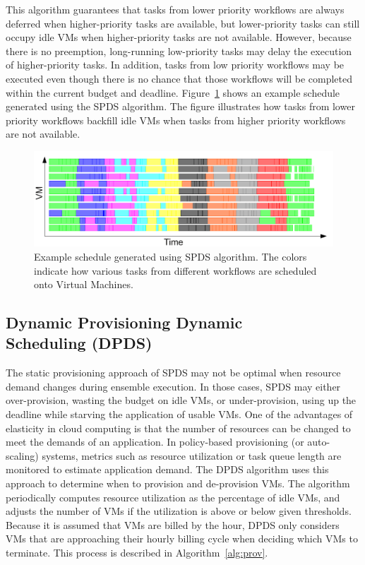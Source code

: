\documentclass{sig-alternate}
\begin{document}
This algorithm guarantees that tasks from lower priority workflows are
always deferred when higher-priority tasks are available, but lower-priority
tasks can still occupy idle VMs when higher-priority tasks are not available. 
However, because there is no preemption, long-running low-priority tasks may delay 
the execution of higher-priority tasks. In addition, tasks from low priority 
workflows may be executed even though there is no chance that those workflows 
will be completed within the current budget and deadline. Figure~\ref{fig:spds-example} 
shows an example schedule generated using the SPDS algorithm. The figure illustrates 
how tasks from lower priority workflows backfill idle VMs when tasks from higher 
priority workflows are not available.

\begin{figure}[htb] 
\centering
\includegraphics[width=1.0\columnwidth]{figures/spds-gantt}
 \caption{Example schedule generated using SPDS algorithm. The colors indicate how various tasks from different workflows are scheduled onto Virtual Machines. }
\label{fig:spds-example}
\end{figure}

\subsection{Dynamic Provisioning Dynamic \\Scheduling (DPDS)}
 
The static provisioning approach of SPDS may not be optimal when resource demand
changes during ensemble execution. In those cases, SPDS may either over-provision, 
wasting the budget on idle VMs, or under-provision, using up the deadline while starving 
the application of usable VMs. One of the advantages of elasticity in cloud computing 
is that the number of resources can be changed to meet the demands of an application.
In policy-based provisioning (or auto-scaling) systems, metrics such as resource 
utilization or task queue length are monitored to estimate application demand.
The DPDS algorithm uses this approach to determine when to provision and de-provision VMs. The 
algorithm periodically computes resource utilization as the percentage of idle VMs, and
adjusts the number of VMs if the utilization is above or below given thresholds.
Because it is assumed that VMs are billed by the hour, DPDS only considers VMs that are
approaching their hourly billing cycle when deciding which VMs to terminate. This process
is described in Algorithm~\ref{alg:prov}.
\end{document}
